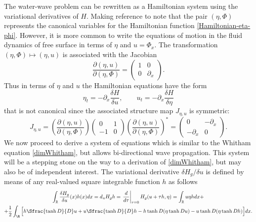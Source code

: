 The water-wave problem can be rewritten as a Hamiltonian system using
the variational derivatives of $H$.
Making reference to \citep{Craig1994, Craig2005} note that
the pair $( \eta, \Phi )$ represents the canonical variables
for the Hamiltonian function \eqref{Hamiltonian-eta-phi}.
However, it is more common to write the equations of motion
in the fluid dynamics of free surface in terms of $\eta$
and $u = \Phi_x$.
The transformation
\(
	( \eta, \Phi ) \mapsto ( \eta, u )
\)
is associated with the Jacobian
%
\[
	\frac{ \partial ( \eta, u ) }{ \partial ( \eta, \Phi )  }	
	=
	\begin{pmatrix}
		1 & 0
		\\
		0 & \partial_x
	\end{pmatrix}
	.
\]
%
Thus in terms of $\eta$ and $u$ the Hamiltonian equations have the form
%
\begin{equation}
\label{Hamilton_system_eta_u}
	\eta_t = - \partial_x \frac{\delta H}{\delta u} 
	, \qquad
	u_t = - \partial_x \frac{\delta H}{\delta \eta}
\end{equation}
%
that is not canonical since the associated structure map $J_{\eta,u}$ is symmetric:
%
\[
	J_{\eta,u}
	=
	\left(
		\frac{ \partial ( \eta, u ) }{ \partial ( \eta, \Phi )  }	
	\right)
	\begin{pmatrix}
		0 & 1
		\\
		-1 & 0
	\end{pmatrix}
	\left(
		\frac{ \partial ( \eta, u ) }{ \partial ( \eta, \Phi )  }	
	\right) ^*
	=
	\begin{pmatrix}
		0 & -\partial_x
		\\
		-\partial_x & 0
	\end{pmatrix}
	.
\]
%
We now proceed to derive a system of equations which is similar to the Whitham equation
\eqref{dimWhitham}, but allows bi-directional wave propagation. This system will be
a stepping stone on the way to a derivation of \eqref{dimWhitham}, but may also be
of independent interest.
The variational derivative ${\delta H_g} / {\delta u}$ is defined
by means of any real-valued square integrable function $h$ as follows
%
\begin{multline*}
	\int _{\mathbb R} \frac{\delta H_g}{\delta u} (x)h(x) dx
	=
	d_u H_g h
	=
	\left. \frac{d}{d\tau} \right| _{\tau = 0} H_g( u + \tau h, \eta )
	= \int _{\mathbb R} u \eta h dx
	+
	\\
	+
	\frac 12 \int_\R
	\Big[
		h \Sfrac{\tanh D}{D} u + u \Sfrac{\tanh D}{D} h -
		h \tanh{D} (\eta \tanh{D} u) - u \tanh{D} (\eta \tanh{D} h)
	\Big]
	dx
	.
\end{multline*}
